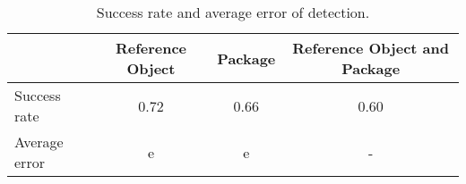 \begin{table}[H]
\centering
\begin{tabular}{@{} l *3c @{}}
\toprule
 & {Reference Object}  & {Package}  & {Reference Object and Package}  \\ 
\midrule
Success rate & 0.72 & 0.66 & 0.60 \\ 
Average error & e & e & - \\
\bottomrule
 \end{tabular}
 \caption{Success rate and average error of detection.}
\label{table:detection_overall}
\end{table}
